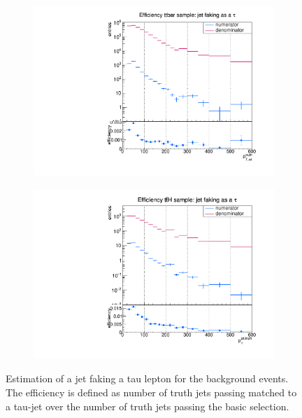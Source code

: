 \begin{figure}
  \centering
                \begin{subfigure}[t]{0.49\textwidth}
                \includegraphics[width=\textwidth]{figures/plots/ttbar/Divided_Jet.pdf}
                \label{DividedJet:bg:ttbar}
                \end{subfigure}
                \begin{subfigure}[t]{0.49\textwidth}
                \includegraphics[width=\textwidth]{figures/plots/ttH/Divided_Jet.pdf}
                \label{DividedJet:bg:ttH}
                \end{subfigure}        
\caption[Estimation of a jet faking a tau lepton for the background events.]{Estimation of a jet faking a tau lepton for the background events. The efficiency is defined as number of truth jets passing matched to a tau-jet over the number of truth jets passing the basic selection.}
\label{DividedJet:bg}
\end{figure}
